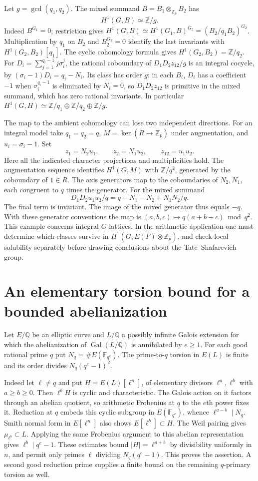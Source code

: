 \documentclass[11pt]{article}
\begin{document}
Let $g=\gcd(q_1,q_2)$. The mixed summand
$B=B_1\otimes_{\mathbb Z_p} B_2$ has
\[
 H^1(G,B)\simeq\mathbb Z/g.
\]
Indeed $B^{G_1}=0$; restriction gives
$H^1(G,B)\simeq H^1(G_1,B)^{G_2}=(B_2/q_1B_2)^{G_2}$.
Multiplication by $q_1$ on $B_2$ and $B_2^{G_2}=0$ identify the
last invariants with $H^1(G_2,B_2)[q_1]$. The cyclic cohomology
formula gives $H^1(G_2,B_2)=\mathbb Z/q_2$.
For $D_i=\sum_{j=1}^{q_i-1}j\sigma_i^j$, the rational coboundary
of $D_1D_2z_{12}/g$ is an integral cocycle, by
$(\sigma_i-1)D_i=q_i-N_i$. Its class has order $g$: in each $B_i$,
$D_i$ has a coefficient $-1$ when $\sigma_i^{q_i-1}$ is eliminated
by $N_i=0$, so $D_1D_2z_{12}$ is primitive in the mixed summand,
which has zero rational invariants. In particular
$H^1(G,H)\simeq\mathbb Z/q_1\oplus\mathbb Z/q_2\oplus\mathbb Z/g$.

The map to the ambient cohomology can lose two independent directions.
For an integral model take $q_1=q_2=q$, $M=\ker(R\to\mathbb Z_p)$
under augmentation, and $u_i=\sigma_i-1$. Set
\[
 z_1=N_2u_1,\qquad z_2=N_1u_2,\qquad z_{12}=u_1u_2 .
\]
Here all the indicated character projections and multiplicities hold.
The augmentation sequence identifies $H^1(G,M)$ with
$\mathbb Z/q^2$, generated by the coboundary of $1\in R$.
The axis generators map to the coboundaries of $N_2,N_1$,
each congruent to $q$ times the generator. For the mixed summand
\[
 D_1D_2u_1u_2/q=q-N_1-N_2+N_1N_2/q.
\]
The final term is invariant. The image of the mixed generator
thus equals $-q$. With these generator conventions the map is
$(a,b,c)\mapsto q(a+b-c)\bmod q^2$. This example concerns integral
$G$-lattices. In the arithmetic application one must determine which
classes survive in $H^1(G,E(F)\otimes\mathbb Z_p)$, and check local
solubility separately before drawing conclusions about the Tate--Shafarevich group.


\section{An elementary torsion bound for a bounded abelianization}
\label{sec:bounded-abelianization}
Let $E/\mathbb Q$ be an elliptic curve and $L/\mathbb Q$ a possibly
infinite Galois extension for which the abelianization of
$\operatorname{Gal}(L/\mathbb Q)$ is annihilated by $e\ge1$.
For each good rational prime $q$ put $N_q=\#E(\mathbb F_{q^e})$.
The prime-to-$q$ torsion in $E(L)$ is finite and its order divides
$N_q(q^e-1)^2$.

Indeed let $\ell\ne q$ and put $H=E(L)[\ell^n]$, of elementary
divisors $\ell^a,\ell^b$ with $a\ge b\ge0$. Then $\ell^b H$ is
cyclic and characteristic. The Galois action on it factors
through an abelian quotient, so arithmetic Frobenius at $q$ to
the $e$th power fixes it. Reduction at $q$ embeds this cyclic
subgroup in $E(\mathbb F_{q^e})$, whence $\ell^{a-b}\mid N_q$.
Smith normal form in $E[\ell^n]$ also shows $E[\ell^b]\subset H$.
The Weil pairing gives $\mu_{\ell^b}\subset L$. Applying the same
Frobenius argument to this abelian representation gives
$\ell^b\mid q^e-1$. These estimates bound $|H|=\ell^{a+b}$
by divisibility uniformly in $n$, and permit only primes $\ell$
dividing $N_q(q^e-1)$. This proves the assertion. A second good
reduction prime supplies a finite bound on the remaining $q$-primary
torsion as well.
\end{document}
